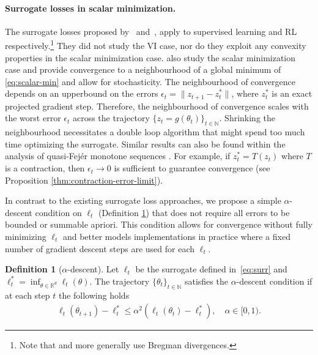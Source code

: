 \documentclass{article} %
\theoremstyle{definition}
\newtheorem{definition}[theorem]{Definition}
\newcommand{\reals}{\mathbb{R}}
\newcommand{\nnumbers}{\mathbb{N}}
\begin{document}
\vspace{-0.5em}
\paragraph{Surrogate losses in scalar minimization.}
The surrogate losses proposed by~\citet{pmlr-v119-johnson20b} and~\citet{vaswani2021general}, apply to supervised learning and RL respectively.\footnote{Note that  \citet{pmlr-v119-johnson20b} and \citet{vaswani2021general} more generally use Bregman divergences.}
They did not study the VI case, nor do they exploit any convexity properties in the scalar minimization case.
\citet{lavington2023target} also study the scalar minimization case and provide convergence to a neighbourhood of a global minimum of \eqref{eq:scalar-min} and allow for stochasticity.
The neighbourhood of convergence depends on an upperbound on the errors $\epsilon_t = \|z_{t+1}-z_t^\ast\|$, where $z_t^\ast$ is an exact projected gradient step.
Therefore, the neighbourhood of convergence scales with the worst error $\epsilon_t$ across the trajectory $\{z_t = g(\theta_t)\}_{t\in \nnumbers}$.
Shrinking the neighbourhood necessitates a double loop algorithm that might spend too much time optimizing the surrogate.
Similar results can also be found within the analysis of quasi-Fej\'er monotone sequences \citep{FRANCI2022161}. 
For example, if $z_t^\ast = T(z_t)$  where $T$ is a contraction, then $\epsilon_t \to 0$ is sufficient to guarantee convergence (see Proposition \ref{thm:contraction-error-limit}).

In contrast to the existing surrogate loss approaches, we propose a simple $\alpha$-descent condition on $\ell_t$ (Definition \ref{eq:alpha}) that does not require all errors to be bounded or summable apriori.
This condition allows for convergence without fully minimizing $\ell_t$ and better models implementations in practice where a fixed number of gradient descent steps are used for each $\ell_t$.  

\begin{definition}[$\alpha$-descent]\label{eq:alpha}Let $\ell_t$ be the surrogate defined in~\eqref{eq:surr} and $\ell_t^\ast = \inf_{\theta \in \reals^d} \ell_t(\theta)$. 
The trajectory $\{\theta_t\}_{t\in \nnumbers}$ satisfies the $\alpha$-descent condition if at each step $t$ the following holds
\begin{align}\label{eq:alpha-ineq}
    \ell_t(\theta_{t+1}) - \ell_t^\ast \leq \alpha^2 \left(\ell_t(\theta_{t}) - \ell_t^\ast \right), \quad \alpha  \in [0, 1).
\end{align}

\end{definition}
\end{document}
